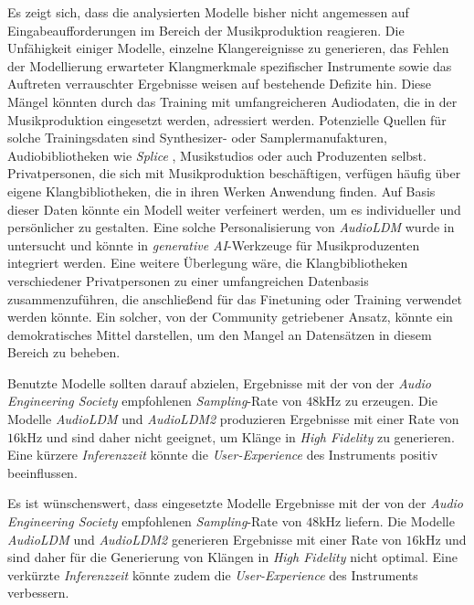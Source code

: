 \documentclass[
  a4paper,  %
  twoside,  %
  bibliography=totoc,
  headsepline,
  cleardoublepage=empty,
  parskip=half,
  draft=false
]{scrbook}
\begin{document}
Es zeigt sich, dass die analysierten Modelle bisher nicht angemessen auf Eingabeaufforderungen im Bereich der Musikproduktion reagieren. Die Unfähigkeit einiger Modelle, einzelne Klangereignisse zu generieren, das Fehlen der Modellierung erwarteter Klangmerkmale spezifischer Instrumente sowie das Auftreten verrauschter Ergebnisse weisen auf bestehende Defizite hin. Diese Mängel könnten durch das Training mit umfangreicheren Audiodaten, die in der Musikproduktion eingesetzt werden, adressiert werden. Potenzielle Quellen für solche Trainingsdaten sind Synthesizer- oder Samplermanufakturen, Audiobibliotheken wie \emph{Splice} \cite{noauthor_royalty-free_nodate}, Musikstudios oder auch Produzenten selbst. Privatpersonen, die sich mit Musikproduktion beschäftigen, verfügen häufig über eigene Klangbibliotheken, die in ihren Werken Anwendung finden. Auf Basis dieser Daten könnte ein Modell weiter verfeinert werden, um es individueller und persönlicher zu gestalten. Eine solche Personalisierung von \emph{AudioLDM} \cite{liu_audioldm_2023} wurde in \cite{plitsis_investigating_2023} untersucht und könnte in \emph{generative AI}-Werkzeuge für Musikproduzenten integriert werden. Eine weitere Überlegung wäre, die Klangbibliotheken verschiedener Privatpersonen zu einer umfangreichen Datenbasis zusammenzuführen, die anschließend für das Finetuning oder Training verwendet werden könnte. Ein solcher, von der Community getriebener Ansatz, könnte ein demokratisches Mittel darstellen, um den Mangel an Datensätzen in diesem Bereich zu beheben. 

Benutzte Modelle sollten darauf abzielen, Ergebnisse mit der von der \emph{Audio Engineering Society} empfohlenen \emph{Sampling}-Rate von $48$kHz \cite{audio_engineering_society_inc_aes5-2018_2018} zu erzeugen. Die Modelle \emph{AudioLDM} \cite{liu_audioldm_2023} und \emph{AudioLDM2} \cite{liu_audioldm2_2023} produzieren Ergebnisse mit einer Rate von $16$kHz und sind daher nicht geeignet, um Klänge in \emph{High Fidelity} zu generieren. Eine kürzere \emph{Inferenzzeit} könnte die \emph{User-Experience} des Instruments positiv beeinflussen.

Es ist wünschenswert, dass eingesetzte Modelle Ergebnisse mit der von der \emph{Audio Engineering Society} empfohlenen \emph{Sampling}-Rate von $48$kHz \cite{audio_engineering_society_inc_aes5-2018_2018} liefern. Die Modelle \emph{AudioLDM} \cite{liu_audioldm_2023} und \emph{AudioLDM2} \cite{liu_audioldm2_2023} generieren Ergebnisse mit einer Rate von $16$kHz und sind daher für die Generierung von Klängen in \emph{High Fidelity} nicht optimal. Eine verkürzte \emph{Inferenzzeit} könnte zudem die \emph{User-Experience} des Instruments verbessern.
\end{document}
